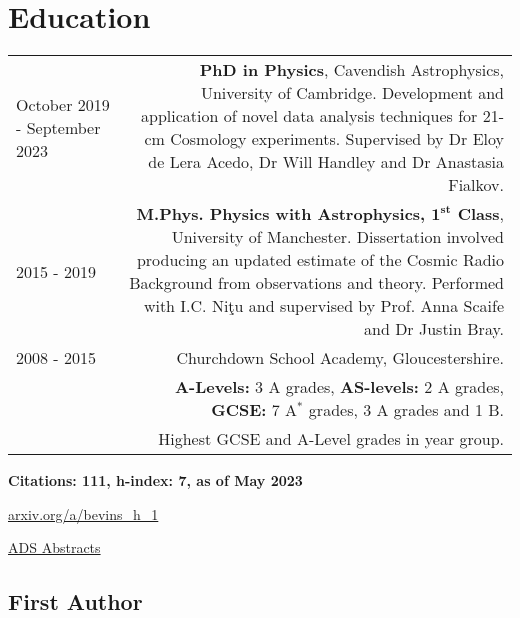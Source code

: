 \documentclass{article}
\begin{document}
\section*{Education}
\begin{tabular}{L!{\vrule}R}
	October 2019 - September 2023 & \textbf{PhD in Physics}, Cavendish Astrophysics, University of Cambridge. Development and application of novel data analysis techniques for 21-cm Cosmology experiments. Supervised by Dr Eloy de Lera Acedo, Dr Will Handley and Dr Anastasia Fialkov. \\
	2015 - 2019 & \textbf{M.Phys. Physics with Astrophysics, $\mathbf{1^{st}}$ Class}, University of Manchester. Dissertation involved producing an updated estimate of the Cosmic Radio Background from observations and theory. Performed with I.C. Ni\c{t}u and supervised by Prof. Anna Scaife and Dr Justin Bray. \\
	2008 - 2015 & Churchdown School Academy, Gloucestershire. \\ &\textbf{A-Levels:} 3 A grades, \textbf{AS-levels:} 2 A grades, \textbf{GCSE:} 7 A$^*$ grades, 3 A grades and 1 B. \\ & Highest GCSE and A-Level grades in year group.
\end{tabular}

 \hfill \textbf{Citations: 111, h-index: 7, as of May 2023}

\hfill \href{http://arxiv.org/a/bevins_h_1}{arxiv.org/a/bevins\_h\_1}

\hfill \href{https://ui.adsabs.harvard.edu/search/p_=0&q=author\%3A\%22Bevins\%2C\%20H.\%20T.\%20J.\%22&sort=date\%20desc\%2C\%20bibcode\%20desc}{ADS Abstracts}

\subsection*{First Author}
\end{document}
